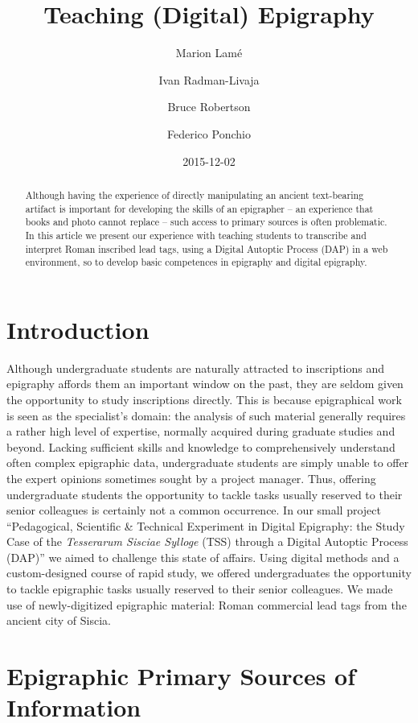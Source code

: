 \documentclass[amsthm,ebook]{saparticle}
\title{Teaching (Digital) Epigraphy}
\author[ilc]{Marion Lamé}
\author[zag]{Ivan Radman-Livaja}
\author[mau]{Bruce Robertson}
\author[isti]{Federico Ponchio\corref{first}}
\date{2015-12-02}
\begin{document}
\maketitle
\begin{abstract}
Although having the experience of directly manipulating an ancient text-bearing artifact is important for developing the
skills of an epigrapher – an experience that books and photo cannot replace – such access to primary sources is often
problematic. In this article we present our experience with teaching students to transcribe and interpret Roman
inscribed lead tags, using a Digital Autoptic Process (DAP) in a web environment, so to develop basic competences in
epigraphy and digital epigraphy.
\end{abstract}

\section{Introduction}

\noindent Although undergraduate students are naturally attracted to inscriptions and epigraphy affords them an important window
on the past, they are seldom given the opportunity to study inscriptions directly. This is because epigraphical work is
seen as the specialist’s domain: the analysis of such material generally requires a rather high level of expertise,
normally acquired during graduate studies and beyond. Lacking sufficient skills and knowledge to comprehensively
understand often complex epigraphic data, undergraduate students are simply unable to offer the expert opinions
sometimes sought by a project manager. Thus, offering undergraduate students the opportunity to tackle tasks usually
reserved to their senior colleagues is certainly not a common occurrence. In our small project ``Pedagogical,
Scientific \& Technical Experiment in Digital Epigraphy: the Study Case of the \emph{Tesserarum Sisciae Sylloge} (TSS) through
a Digital Autoptic Process (DAP)'' we aimed to challenge this state of affairs. Using digital methods and a
custom-designed course of rapid study, we offered undergraduates the opportunity to tackle epigraphic tasks usually
reserved to their senior colleagues. We made use of newly-digitized epigraphic material: Roman commercial lead tags
from the ancient city of Siscia.

\section{Epigraphic Primary Sources of Information}
\end{document}
